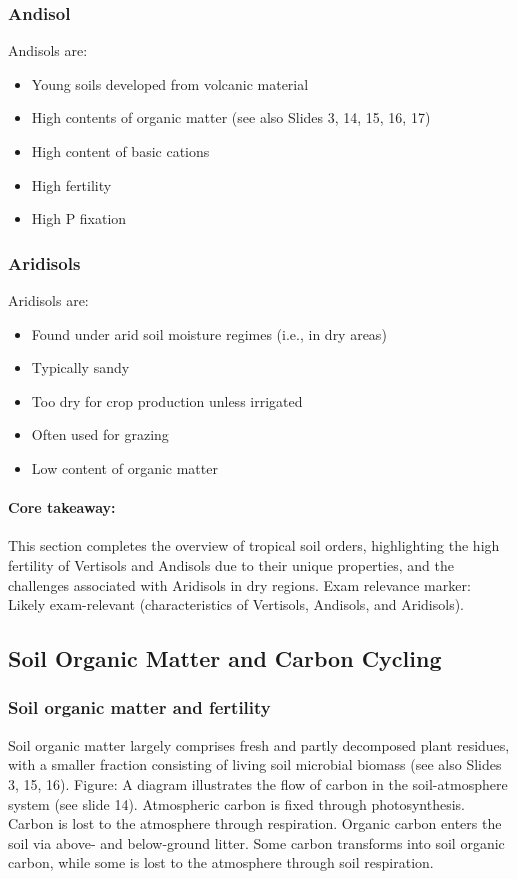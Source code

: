 \subsubsection*{Andisol} Andisols are: 

\begin{itemize} 
    \item Young soils developed from volcanic material 
    \item High contents of organic matter (see also Slides 3, 14, 15, 16, 17) 
    \item High content of basic cations 
    \item High fertility 
    \item High P fixation 
\end{itemize}

\subsubsection*{Aridisols} 
Aridisols are: 
\begin{itemize} 
    \item Found under arid soil moisture regimes (i.e., in dry areas) 
    \item Typically sandy 
    \item Too dry for crop production unless irrigated 
    \item Often used for grazing 
    \item Low content of organic matter 
\end{itemize}

\paragraph*{Core takeaway:} 
This section completes the overview of tropical soil orders, highlighting the high fertility of Vertisols and Andisols due to their unique properties, and the challenges associated with Aridisols in dry regions. Exam relevance marker: Likely exam-relevant (characteristics of Vertisols, Andisols, and Aridisols).

\subsection{Soil Organic Matter and Carbon Cycling} \subsubsection*{Soil organic matter and fertility} 
Soil organic matter largely comprises fresh and partly decomposed plant residues, with a smaller fraction consisting of living soil microbial biomass (see also Slides 3, 15, 16). Figure: A diagram illustrates the flow of carbon in the soil-atmosphere system (see slide 14). Atmospheric carbon is fixed through photosynthesis. Carbon is lost to the atmosphere through respiration. Organic carbon enters the soil via above- and below-ground litter. Some carbon transforms into soil organic carbon, while some is lost to the atmosphere through soil respiration.


